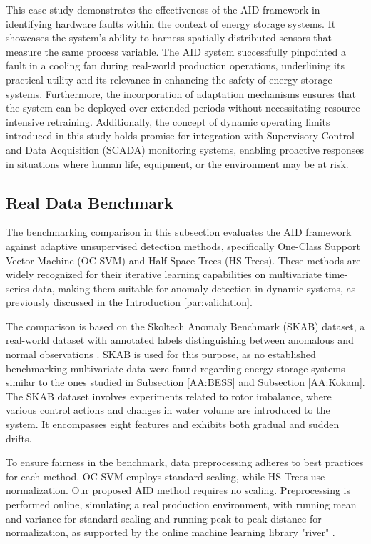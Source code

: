 This case study demonstrates the effectiveness of the AID framework in identifying hardware faults within the context of energy storage systems. It showcases the system's ability to harness spatially distributed sensors that measure the same process variable. The AID system successfully pinpointed a fault in a cooling fan during real-world production operations, underlining its practical utility and its relevance in enhancing the safety of energy storage systems. Furthermore, the incorporation of adaptation mechanisms ensures that the system can be deployed over extended periods without necessitating resource-intensive retraining. Additionally, the concept of dynamic operating limits introduced in this study holds promise for integration with Supervisory Control and Data Acquisition (SCADA) monitoring systems, enabling proactive responses in situations where human life, equipment, or the environment may be at risk.

\subsection{Real Data Benchmark}\label{AA:Benchmark}
The benchmarking comparison in this subsection evaluates the AID framework against adaptive unsupervised detection methods, specifically One-Class Support Vector Machine (OC-SVM) and Half-Space Trees (HS-Trees). These methods are widely recognized for their iterative learning capabilities on multivariate time-series data, making them suitable for anomaly detection in dynamic systems, as previously discussed in the Introduction \ref{par:validation}.

The comparison is based on the Skoltech Anomaly Benchmark (SKAB) dataset, a real-world dataset with annotated labels distinguishing between anomalous and normal observations \citep{skab2020}. SKAB is used for this purpose, as no established benchmarking multivariate data were found regarding energy storage systems similar to the ones studied in Subsection \ref{AA:BESS} and Subsection \ref{AA:Kokam}. The SKAB dataset involves experiments related to rotor imbalance, where various control actions and changes in water volume are introduced to the system. It encompasses eight features and exhibits both gradual and sudden drifts.

To ensure fairness in the benchmark, data preprocessing adheres to best practices for each method. OC-SVM employs standard scaling, while HS-Trees use normalization. Our proposed AID method requires no scaling. Preprocessing is performed online, simulating a real production environment, with running mean and variance for standard scaling and running peak-to-peak distance for normalization, as supported by the online machine learning library "river" \citep{Montiel2021}.

